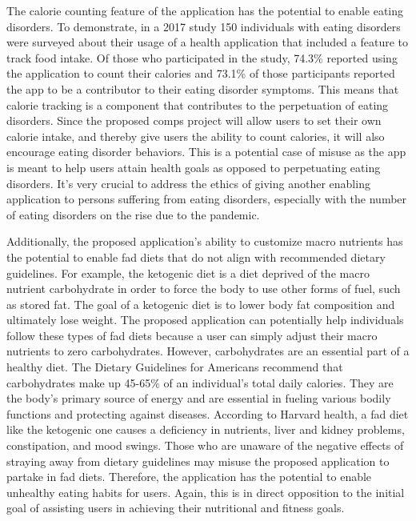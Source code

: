 \documentclass[10pt,twocolumn]{article}
\begin{document}
The calorie counting feature of the application has the potential to enable eating disorders. To demonstrate, in a 2017 study 150 individuals with eating disorders were surveyed about their usage of a health application that included a feature to track food intake.\cite{psyd} Of those who participated in the study, 74.3\% reported using the application to count their calories and 73.1\% of those participants reported the app to be a contributor to their eating disorder symptoms. This means that calorie tracking is a component that contributes to the perpetuation of eating disorders. Since the proposed comps project will allow users to set their own calorie intake, and thereby give users the ability to count calories, it will also encourage eating disorder behaviors. This is a potential case of misuse as the app is meant to help users attain health goals as opposed to perpetuating eating disorders. It's very crucial to address the ethics of giving another enabling application to persons suffering from eating disorders, especially with the number of eating disorders on the rise due to the pandemic.\cite{katella_2021}

Additionally, the proposed application’s ability to customize macro nutrients has the potential to enable fad diets that do not align with recommended dietary guidelines. For example, the ketogenic diet is a diet deprived of the macro nutrient carbohydrate in order to force the body to use other forms of fuel, such as stored fat. The goal of a ketogenic diet is to lower body fat composition and ultimately lose weight. The proposed application can potentially help individuals follow these types of fad diets because a user can simply adjust their macro nutrients to zero carbohydrates. However, carbohydrates are an essential part of a healthy diet. The Dietary Guidelines for Americans recommend that carbohydrates make up 45-65\% of an individual’s total daily calories. They are the body’s primary source of energy and are essential in fueling various bodily functions and protecting against diseases.\cite{mayo clinic_2022} According to Harvard health, a fad diet like the ketogenic one causes a deficiency in nutrients, liver and kidney problems, constipation, and mood swings.\cite{harvard health_2020} Those who are unaware of the negative effects of straying away from dietary guidelines may misuse the proposed application to partake in fad diets. Therefore, the application has the potential to enable unhealthy eating habits for users. Again, this is in direct opposition to the initial goal of assisting users in achieving their nutritional and fitness goals. 
\end{document}
